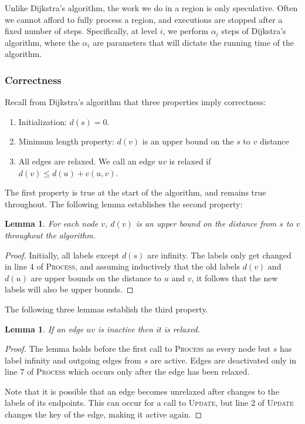 \documentclass[11pt]{article}
\newtheorem{lemma}[theorem]{Lemma}
\begin{document}
Unlike Dijkstra's algorithm, the work we do in a region is only speculative. Often we cannot afford to fully process a region, and executions are stopped after a fixed number of steps. Specifically, at level $i$, we perform $\alpha_i$ steps of Dijkstra's algorithm, where the $\alpha_i$ are parameters that will dictate the running time of the algorithm.

\subsubsection{Correctness}
\label{sec:correctness}

Recall from Dijkstra's algorithm that three properties imply correctness:
\begin{enumerate}
\item Initialization: $d(s) = 0$.
\item Minimum length property: $d(v)$ is an upper bound on the $s$ to $v$ distance
\item All edges are relaxed. We call an edge $uv$ is relaxed if $d(v) \leq d(u) + c(u,v)$.
\end{enumerate}

The first property is true at the start of the algorithm, and remains true throughout. The following lemma establishes the second property:\\

\begin{lemma}
  For each node $v$, $d(v)$ is an upper bound on the distance from $s$ to $v$ throughout the algorithm.
\end{lemma}

\begin{proof}
  Initially, all labels except $d(s)$ are infinity. The labels only get changed in line $4$ of \textsc{Process}, and assuming inductively that the old labels $d(v)$ and $d(u)$ are upper bounds on the distance to $u$ and $v$, it follows that the new labels will also be upper bounds.
\end{proof}

The following three lemmas establish the third property.\\

\begin{lemma}
  If an edge $uv$ is inactive then it is relaxed.
\end{lemma}

\begin{proof}
  The lemma holds before the first call to \textsc{Process} as every node but $s$ has label infinity and outgoing edges from $s$ are active. Edges are deactivated only in line $7$ of \textsc{Process} which occurs only after the edge has been relaxed.

  Note that it is possible that an edge becomes unrelaxed after changes to the labels of its endpoints. This can occur for a call to \textsc{Update}, but line $2$ of \textsc{Update} changes the key of the edge, making it active again.
\end{proof}
\end{document}
